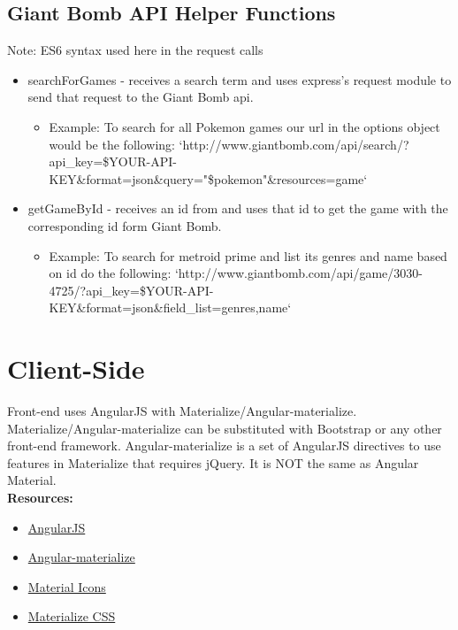 \documentclass{article}
\begin{document}
\subsection{Giant Bomb API Helper Functions}
Note: ES6 syntax used here in the request calls
\begin{itemize}
  \item searchForGames - receives a search term and uses express’s request module to send that request to the Giant Bomb api.
  \begin{itemize}
    \item \sloppy Example: To search for all Pokemon games our url in the options object would be the following:
   `http://www.giantbomb.com/api/search/?api\_key=\${YOUR-API-KEY}\&format=json\&query="\${pokemon}"\&resources=game`
 \end{itemize}
  \item getGameById - receives an id from and uses that id to get the game with the corresponding id form Giant Bomb.
  \begin{itemize}
    \item \sloppy Example: To search for metroid prime and list its genres and name based on id do the following:
   `http://www.giantbomb.com/api/game/3030-4725/?api\_key=\${YOUR-API-KEY}\&format=json\&field\_list=genres,name`
 \end{itemize}
\end{itemize}

\section{Client-Side}
Front-end uses AngularJS with Materialize/Angular-materialize. Materialize/Angular-materialize can be substituted with Bootstrap or any other front-end framework. Angular-materialize is a set of AngularJS directives to use features in Materialize that requires jQuery. It is NOT the same as Angular Material.
\\
\textbf{Resources:}
\begin{itemize}
  \item \href {https://docs.angularjs.org/api}{AngularJS}
  \item \href {https://krescruz.github.io/angular-materialize/}{Angular-materialize}
  \item \href {https://getmdl.io/started/}{Material Icons}
  \item \href {http://materializecss.com/}{Materialize CSS}
\end{itemize}
\end{document}

